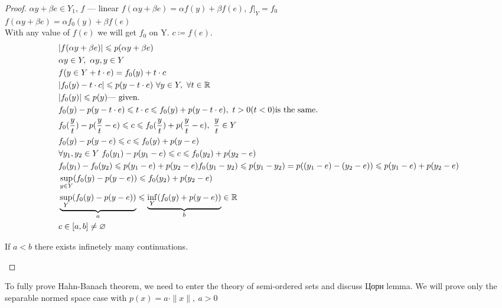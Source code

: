 \begin{proof}
  $\alpha y + \beta e \in Y_1$, $f$ --- linear $f(\alpha y + \beta e) = \alpha
  f(y) + \beta f(e)$, $f|_Y = f_0$ \\
  $f(\alpha y + \beta e) = \alpha f_0(y) + \beta f(e)$ \\
  With any value of $f(e)$ we will get $f_0$ on Y. $c \coloneqq f(e)$. 
  \begin{align*}
    &|f(\alpha y + \beta e)| \leq p(\alpha y + \beta e) \\
    &\alpha y \in Y,\ \alpha y, y \in Y \\
    &f(y \in Y + t \cdot e) = f_0(y) + t \cdot c \\
    &|f_0(y) - t \cdot c| \leq p(y - t \cdot e)\ \forall y \in Y,\ \forall t \in \R \\
    &|f_0(y)| \leq p(y) \text{--- given}. \\
    &f_0(y) - p(y - t \cdot e) \leq t \cdot c \leq f_0(y) + p(y - t \cdot e),\ t >
      0 (t < 0) \text{is the same}. \\
    &f_0(\dfrac{y}{t}) - p(\dfrac{y}{t} - e) \leq c \leq f_0(\dfrac{y}{t}) +
      p(\dfrac{y}{t} - e),\ \dfrac{y}{t} \in Y \\
    &f_0(y) - p(y - e) \leq c \leq f_0(y) + p(y - e) \\
    &\forall y_1, y_2 \in Y\ f_0(y_1) - p(y_1 - e) \leq c \leq f_0(y_2) + p(y_2 -
      e) \\
    &f_0(y_1) - f_0(y_2) \leq p(y_1 - e) + p(y_2 - e)
      f_0(y_1 - y_2) \leq p(y_1 - y_2) = p((y_1 - e) - (y_2 - e))
      \leq p(y_1 - e) + p(y_2 - e) \\
    &\sup\limits_{y \in Y}(f_0(y) - p(y - e)) \leq f_0(y_2) + p(y_2 - e) \\
    &\underbrace{\sup\limits_Y (f_0(y) - p(y - e))}_{a} \leq \underbrace{\inf\limits_Y (f_0(y) + p(y - e))}_{b}
      \in \R \\
    &c \in [a, b] \neq \varnothing
  \end{align*}

    \begin{note}
      If $a < b$ there exists infinetely many continuations.
     \end{note}
\end{proof}

To fully prove Hahn-Banach theorem, we need to enter the theory of semi-ordered
sets and discuss Цорн lemma. We will prove only the separable normed space case with
$p(x) = a \cdot \|x\|,\ a > 0$ 

